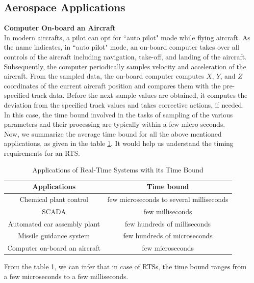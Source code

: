 \documentclass[12pt]{report}
\begin{document}
\subsection{Aerospace Applications}
\noindent\textbf{Computer On-board an Aircraft}\\
In modern aircrafts, a pilot can opt for ``auto pilot" mode while flying aircraft. As the name indicates, in ``auto pilot" mode, an on-board computer takes over all controls of the aircraft including navigation, take-off, and landing of the aircraft. Subsequently,  the computer periodically samples velocity and acceleration of the aircraft. From the sampled data, the on-board computer computes $X$, $Y$, and $Z$ coordinates of the current aircraft position and compares them with the pre-specified track data. Before the next sample values are obtained, it computes the deviation from the specified track values and takes corrective actions, if needed. In this case, the time bound involved in the tasks of sampling of the various parameters and their processing are typically within a few micro seconds. \\

Now, we summarize the average time bound for all the above mentioned applications, as given in the table \ref{table:1}. It would help us understand the timing requirements for an RTS. 
\begin{table}[h]
\centering
\begin{tabular}{|c|c|}
 \hline
 \textbf{Applications} & \textbf{Time bound} \\
 \hline \hline
 Chemical plant control & few microseconds to several milliseconds \\ 
 \hline
SCADA & few milliseconds \\ 
 \hline
 Automated car assembly plant & few hundreds of milliseconds\\ 
 \hline
 Missile guidance system & few hundreds of microseconds\\ 
 \hline
 Computer on-board an aircraft & few microseconds \\
 \hline
\end{tabular}
\caption{Applications of Real-Time Systems with its Time Bound}
\label{table:1}
\end{table}

From the table \ref{table:1}, we can infer that in case of RTSs, the time bound ranges from a few microseconds to a few milliseconds. 
\end{document}
